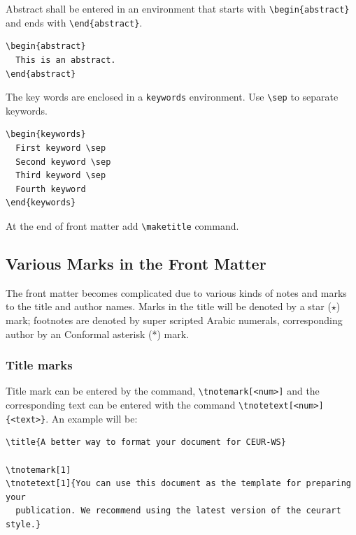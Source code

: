 \documentclass[
]{ceurart}
\begin{document}
Abstract shall be entered in an environment that starts
with \verb|\begin{abstract}| and ends with
\verb|\end{abstract}|. 

\begin{lstlisting}
\begin{abstract}
  This is an abstract.
\end{abstract}
\end{lstlisting}

The key words are enclosed in a \verb|keywords|
environment. Use \verb|\sep| to separate keywords.

\begin{lstlisting}
\begin{keywords}
  First keyword \sep 
  Second keyword \sep 
  Third keyword \sep 
  Fourth keyword
\end{keywords}
\end{lstlisting}

At the end of front matter add \verb|\maketitle| command.

\subsection{Various Marks in the Front Matter}

The front matter becomes complicated due to various kinds
of notes and marks to the title and author names. Marks in
the title will be denoted by a star ($\star$) mark;
footnotes are denoted by super scripted Arabic numerals,
corresponding author by an Conformal asterisk (*) mark.

\subsubsection{Title marks}

Title mark can be entered by the command, \verb|\tnotemark[<num>]|
and the corresponding text can be entered with the command
\verb|\tnotetext[<num>]{<text>}|. An example will be:

\begin{lstlisting}
\title{A better way to format your document for CEUR-WS}

\tnotemark[1]
\tnotetext[1]{You can use this document as the template for preparing your
  publication. We recommend using the latest version of the ceurart style.}
\end{lstlisting}
\end{document}
